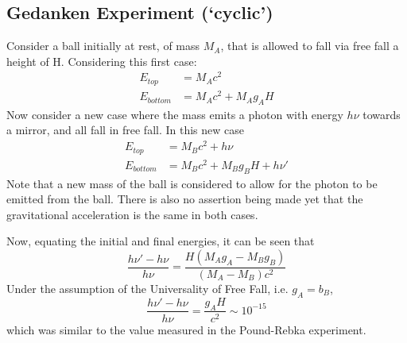 \subsection{Gedanken Experiment (`cyclic')}
Consider a ball initially at rest, of mass $M_A$, that is allowed to fall via free fall a height of H. Considering this first case:
\begin{align*}
    E_{top} & = M_A c^2 \\ E_{bottom} & = M_A c^2 + M_A g_A H
\end{align*}
Now consider a new case where the mass emits a photon with energy $h \nu$ towards a mirror, and all fall in free fall. In this new case
\begin{align*}
    E_{top} & = M_B c^2 + h \nu \\ E_{bottom} & = M_B c^2 + M_B g_B H + h \nu'
\end{align*}
Note that a new mass of the ball is considered to allow for the photon to be emitted from the ball. There is also no assertion being made yet that the gravitational acceleration is the same in both cases. \par Now, equating the initial and final energies, it can be seen that
$$ \frac{h \nu' - h \nu}{h \nu} = \frac{H(M_A g_A - M_B g_B)}{(M_A - M_B)c^2} $$
Under the assumption of the Universality of Free Fall, i.e. $g_A = b_B$, 
$$ \frac{h \nu' - h \nu}{h \nu} = \frac{g_A H}{c^2} \sim 10^{-15} $$
which was similar to the value measured in the Pound-Rebka experiment.

